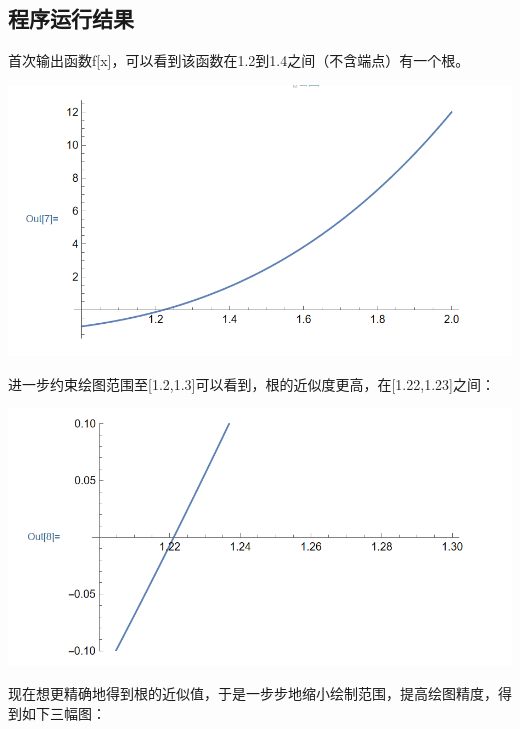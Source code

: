\documentclass{ctexart}
\begin{document}
\subsection{程序运行结果}
\noindent 首次输出函数f[x]，可以看到该函数在1.2到1.4之间（不含端点）有一个根。
\begin{center}
	\includegraphics[scale=0.5]{1.png}\\
\end{center}
进一步约束绘图范围至[1.2,1.3]可以看到，根的近似度更高，在[1.22,1.23]之间：
\begin{center}
	\includegraphics[scale=0.5]{2.png}\\
\end{center}
现在想更精确地得到根的近似值，于是一步步地缩小绘制范围，提高绘图精度，得到如下三幅图：
\end{document}
